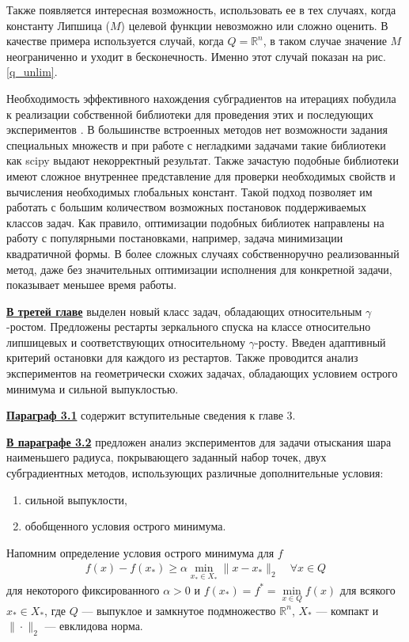 Также появляется интересная возможность, использовать ее в тех случаях, когда константу Липшица ($M$) целевой функции невозможно или сложно оценить. В качестве примера используется случай, когда $Q = \mathbb{R}^n$, в таком случае значение $M$ неограниченно и уходит в бесконечность. Именно этот случай показан на рис. \ref{q_unlim}. 

Необходимость эффективного нахождения субградиентов на итерациях побудила к реализации собственной библиотеки для проведения этих и последующих экспериментов \cite{mygit}. В большинстве встроенных методов нет возможности задания специальных  множеств и при работе с негладкими задачами такие библиотеки как scipy выдают некорректный результат. Также зачастую подобные библиотеки имеют сложное внутреннее представление для проверки необходимых свойств и вычисления необходимых глобальных констант. Такой подход позволяет им работать с большим количеством возможных постановок поддерживаемых классов задач. Как правило, оптимизации подобных библиотек направлены на работу с популярными постановками, например, задача минимизации квадратичной формы. В более сложных случаях собственноручно реализованный метод, даже без значительных оптимизации исполнения для конкретной задачи, показывает меньшее время работы. 


\underline{\textbf{В третей главе}} выделен новый класс задач, обладающих относительным $\gamma$-ростом. Предложены рестарты зеркального спуска на классе относительно липшицевых и соответствующих относительному $\gamma$-росту. Введен адаптивный критерий остановки для каждого из рестартов. Также проводится анализ экспериментов на геометрически схожих задачах, обладающих условием острого минимума и сильной выпуклостью. 

\underline{\textbf{Параграф 3.1}} содержит вступительные сведения к главе 3. 

\underline{\textbf{В параграфе 3.2}} предложен анализ экспериментов для задачи отыскания шара наименьшего радиуса, покрывающего заданный набор точек, двух субградиентных методов, использующих различные дополнительные условия:
\begin{enumerate}
    \item сильной выпуклости,
    \item обобщенного условия острого минимума.
\end{enumerate}

Напомним определение условия острого минимума для $f$
\begin{gather}\label{sm}
    f(x) - f(x_*) \geq \alpha \min_{x_* \in X_*} \|x- x_*\|_2 \quad \forall x \in Q
\end{gather}
для некоторого фиксированного $\alpha >0$ и $f(x_*) = f^* = \min\limits_{x\in Q} f(x)$ для всякого $x_* \in X_*$, где $Q$ --- выпуклое и замкнутое подмножество $\mathbb{R}^n$, $X_*$ --- компакт и $\|\cdot\|_2$ --- евклидова норма. 


